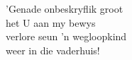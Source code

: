 ’Genade onbeskryflik groot \\
het U aan my bewys \\
verlore seun ’n wegloopkind \\
weer in die vaderhuis! \\

